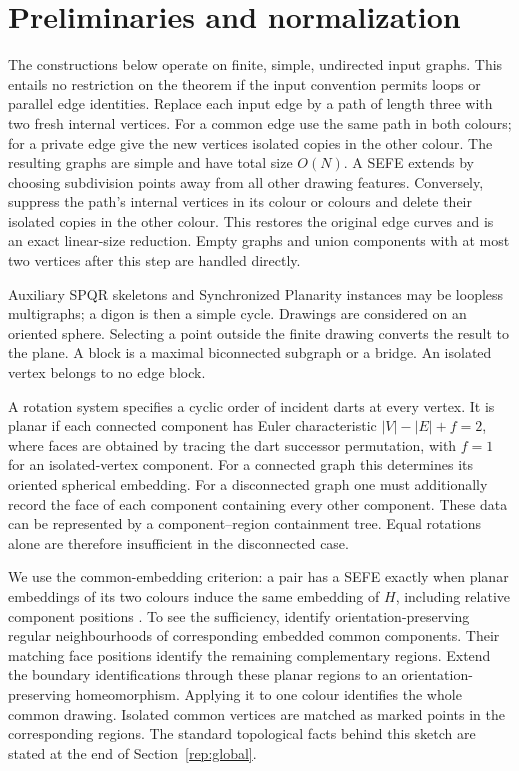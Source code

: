\section{Preliminaries and normalization}
\label{sec:normalization}

The constructions below operate on finite, simple, undirected input graphs.
This entails no restriction on the theorem if the input convention permits
loops or parallel edge identities. Replace each input edge by a path of
length three with two fresh internal vertices. For a common edge use the
same path in both colours; for a private edge give the new vertices
isolated copies in the other colour. The resulting graphs are simple and
have total size $O(N)$. A SEFE extends by choosing subdivision points away
from all other drawing features. Conversely, suppress the path's internal
vertices in its colour or colours and delete their isolated copies in the
other colour. This restores the original edge curves and is an exact
linear-size reduction. Empty graphs and union components with at most two
vertices after this step are handled directly.

Auxiliary SPQR skeletons and Synchronized Planarity instances may be loopless
multigraphs; a digon is then a simple cycle. Drawings are considered on an
oriented sphere. Selecting a point outside the finite drawing converts the
result to the plane. A block is a maximal biconnected subgraph or a bridge.
An isolated vertex belongs to no edge block.

A rotation system specifies a cyclic order of incident darts at every
vertex. It is planar if each connected component has Euler characteristic
$|V|-|E|+f=2$, where faces are obtained by tracing the dart successor
permutation, with $f=1$ for an isolated-vertex component. For a connected graph this determines its oriented spherical
embedding. For a disconnected graph one must additionally record the face
of each component containing every other component. These data can be
represented by a component--region containment tree. Equal rotations alone
are therefore insufficient in the disconnected case.

We use the common-embedding criterion: a pair has a SEFE exactly when
planar embeddings of its two colours induce the same embedding of $H$,
including relative component positions \cite[Theorem~4]{junger}. To see the sufficiency,
identify orientation-preserving regular neighbourhoods of corresponding
embedded common components. Their matching face positions identify the
remaining complementary regions. Extend the boundary identifications
through these planar regions to an orientation-preserving homeomorphism.
Applying it to one colour identifies the whole common drawing. Isolated
common vertices are matched as marked points in the corresponding regions.
The standard topological facts behind this sketch are stated at the end of
Section~\ref{rep:global}.

